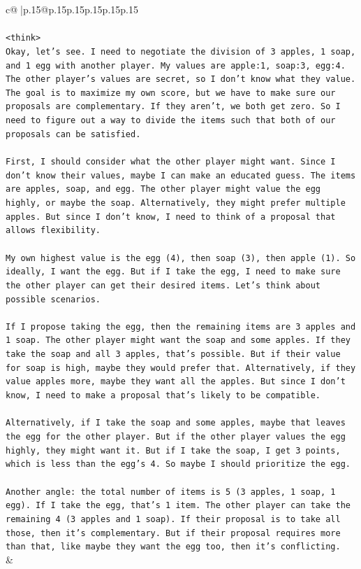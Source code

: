 \documentclass{article}
\begin{document}
{\begin{supertabular}{c@{$\;$}|p{.15\linewidth}@{}p{.15\linewidth}p{.15\linewidth}p{.15\linewidth}p{.15\linewidth}p{.15\linewidth}}
{{{\\ 
\\ 
\texttt{<think>} \\
\texttt{Okay, let's see. I need to negotiate the division of 3 apples, 1 soap, and 1 egg with another player. My values are apple:1, soap:3, egg:4. The other player's values are secret, so I don't know what they value. The goal is to maximize my own score, but we have to make sure our proposals are complementary. If they aren't, we both get zero. So I need to figure out a way to divide the items such that both of our proposals can be satisfied.} \\
\\ 
\texttt{First, I should consider what the other player might want. Since I don't know their values, maybe I can make an educated guess. The items are apples, soap, and egg. The other player might value the egg highly, or maybe the soap. Alternatively, they might prefer multiple apples. But since I don't know, I need to think of a proposal that allows flexibility.} \\
\\ 
\texttt{My own highest value is the egg (4), then soap (3), then apple (1). So ideally, I want the egg. But if I take the egg, I need to make sure the other player can get their desired items. Let's think about possible scenarios.} \\
\\ 
\texttt{If I propose taking the egg, then the remaining items are 3 apples and 1 soap. The other player might want the soap and some apples. If they take the soap and all 3 apples, that's possible. But if their value for soap is high, maybe they would prefer that. Alternatively, if they value apples more, maybe they want all the apples. But since I don't know, I need to make a proposal that's likely to be compatible.} \\
\\ 
\texttt{Alternatively, if I take the soap and some apples, maybe that leaves the egg for the other player. But if the other player values the egg highly, they might want it. But if I take the soap, I get 3 points, which is less than the egg's 4. So maybe I should prioritize the egg.} \\
\\ 
\texttt{Another angle: the total number of items is 5 (3 apples, 1 soap, 1 egg). If I take the egg, that's 1 item. The other player can take the remaining 4 (3 apples and 1 soap). If their proposal is to take all those, then it's complementary. But if their proposal requires more than that, like maybe they want the egg too, then it's conflicting.} \\
            }
        }
    }
    & \\ \\


\end{supertabular}}
\end{document}
